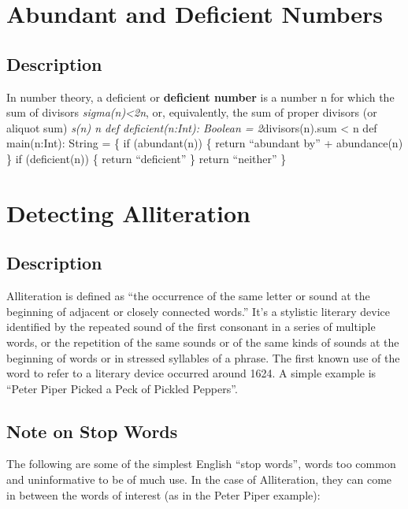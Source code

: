 \section{Abundant and Deficient Numbers}

\subsection*{Description}\label{description-12}

In number theory, a deficient or \textbf{deficient number} is a number n
for which the sum of divisors \emph{sigma(n)\textless{}2n}, or,
equivalently, the sum of proper divisors (or aliquot sum) \emph{s(n) n
def deficient(n:Int): Boolean = 2}divisors(n).sum \textless{} n def
main(n:Int): String = \{ if (abundant(n)) \{ return ``abundant by'' +
abundance(n) \} if (deficient(n)) \{ return ``deficient'' \} return
``neither'' \}


\section{Detecting Alliteration}

\subsection*{Description}\label{description-13}

Alliteration is defined as ``the occurrence of the same letter or sound
at the beginning of adjacent or closely connected words.'' It's a
stylistic literary device identified by the repeated sound of the first
consonant in a series of multiple words, or the repetition of the same
sounds or of the same kinds of sounds at the beginning of words or in
stressed syllables of a phrase. The first known use of the word to refer
to a literary device occurred around 1624. A simple example is ``Peter
Piper Picked a Peck of Pickled Peppers''.

\subsection*{Note on Stop Words}\label{note-on-stop-words}

The following are some of the simplest English ``stop words'', words too
common and uninformative to be of much use. In the case of Alliteration,
they can come in between the words of interest (as in the Peter Piper
example):

